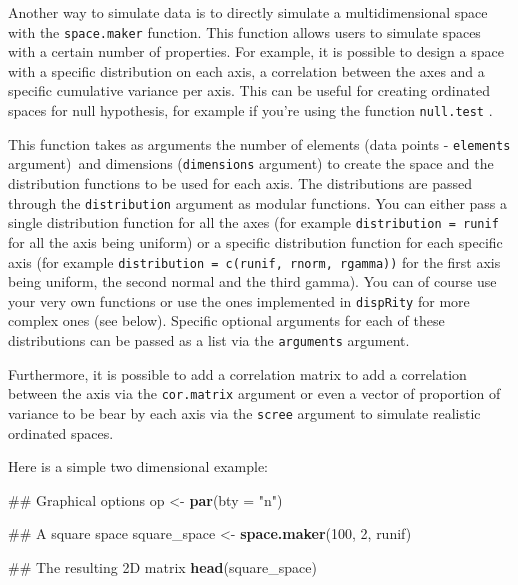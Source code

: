 \documentclass[]{book}
\newenvironment{Shaded}{\begin{snugshade}}{\end{snugshade}}
\newcommand{\KeywordTok}[1]{\textcolor[rgb]{0.13,0.29,0.53}{\textbf{#1}}}
\newcommand{\DataTypeTok}[1]{\textcolor[rgb]{0.13,0.29,0.53}{#1}}
\newcommand{\DecValTok}[1]{\textcolor[rgb]{0.00,0.00,0.81}{#1}}
\newcommand{\StringTok}[1]{\textcolor[rgb]{0.31,0.60,0.02}{#1}}
\newcommand{\NormalTok}[1]{#1}
\theoremstyle{definition}
\theoremstyle{definition}
\theoremstyle{remark}
\begin{document}
Another way to simulate data is to directly simulate a multidimensional
space with the \texttt{space.maker} function. This function allows users
to simulate spaces with a certain number of properties. For example, it
is possible to design a space with a specific distribution on each axis,
a correlation between the axes and a specific cumulative variance per
axis. This can be useful for creating ordinated spaces for null
hypothesis, for example if you're using the function \texttt{null.test}
\citep{diaz2016global}.

This function takes as arguments the number of elements (data points -
\texttt{elements} argument)~and dimensions (\texttt{dimensions}
argument) to create the space and the distribution functions to be used
for each axis. The distributions are passed through the
\texttt{distribution} argument as modular functions. You can either pass
a single distribution function for all the axes (for example
\texttt{distribution\ =\ runif} for all the axis being uniform) or a
specific distribution function for each specific axis (for example
\texttt{distribution\ =\ c(runif,\ rnorm,\ rgamma))} for the first axis
being uniform, the second normal and the third gamma). You can of course
use your very own functions or use the ones implemented in
\texttt{dispRity} for more complex ones (see below). Specific optional
arguments for each of these distributions can be passed as a list via
the \texttt{arguments} argument.

Furthermore, it is possible to add a correlation matrix to add a
correlation between the axis via the \texttt{cor.matrix} argument or
even a vector of proportion of variance to be bear by each axis via the
\texttt{scree} argument to simulate realistic ordinated spaces.

Here is a simple two dimensional example:

\begin{Shaded}
\begin{Highlighting}[]
\NormalTok{## Graphical options}
\NormalTok{op <-}\StringTok{ }\KeywordTok{par}\NormalTok{(}\DataTypeTok{bty =} \StringTok{"n"}\NormalTok{)}

\NormalTok{## A square space}
\NormalTok{square_space <-}\StringTok{ }\KeywordTok{space.maker}\NormalTok{(}\DecValTok{100}\NormalTok{, }\DecValTok{2}\NormalTok{, runif)}

\NormalTok{## The resulting 2D matrix}
\KeywordTok{head}\NormalTok{(square_space)}
\end{Highlighting}
\end{Shaded}
\end{document}
